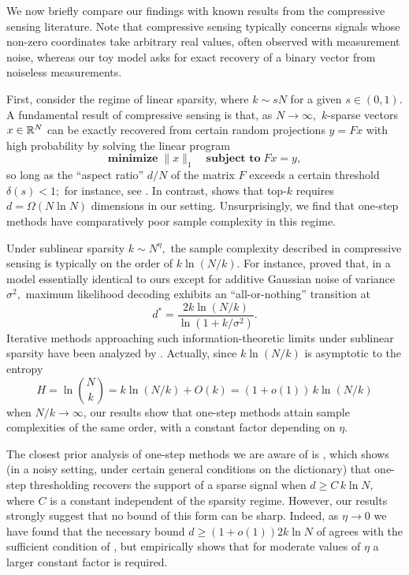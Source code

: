 We now briefly compare our findings with known results from the compressive sensing literature. Note that compressive sensing typically concerns signals whose non-zero coordinates take arbitrary real values, often observed with measurement noise, whereas our toy model asks for exact recovery of a binary vector from noiseless measurements.

First, consider the regime of linear sparsity, where $k \sim s N$ for a given $s \in (0, 1).$ A fundamental result of compressive sensing is that, as $N \to \infty,$ $k$-sparse vectors $x \in \mathbb{R}^N$ can be exactly recovered from certain random projections $y = F x$ with high probability by solving the linear program
$$
\textbf{minimize} \; \lVert x \rVert_1 \quad \textbf{subject to} \; F x = y,
$$
so long as the ``aspect ratio'' $d/N$ of the matrix $F$ exceeds a certain threshold $\delta(s) < 1;$ for instance, see \citet{donoho_precise_2010}. In contrast,  shows that top-$k$ requires $d = \Omega(N \ln N)$ dimensions in our setting. Unsurprisingly, we find that one-step methods have comparatively poor sample complexity in this regime.

Under sublinear sparsity $k \sim N^\eta,$ the sample complexity described in compressive sensing is typically on the order of $k \ln (N/k).$ For instance, \citet{reeves_all-or-nothing_2019} proved that, in a model essentially identical to ours except for additive Gaussian noise of variance $\sigma^2,$ maximum likelihood decoding exhibits an ``all-or-nothing'' transition at
$$
d^* = \frac{2 k \ln (N/k)}{\ln(1 + k/\sigma^2)}.
$$
Iterative methods approaching such information-theoretic limits under sublinear sparsity have been analyzed by \citet{truong_fundamental_2023, takeuchi_generalized_2024}. Actually, since $k \ln (N/k)$ is asymptotic to the entropy
$$
H = \ln \binom N k = k \ln (N/k) + O(k) = (1 + o(1)) \, k \ln(N/k)
$$
when $N/k \to \infty$, our results show that one-step methods attain sample complexities of the same order, with a constant factor depending on $\eta.$

The closest prior analysis of one-step methods we are aware of is \citet{bajwa_why_2010}, which shows (in a noisy setting, under certain general conditions on the dictionary) that one-step thresholding recovers the support of a sparse signal when $d \ge C\, k \ln N,$ where $C$ is a constant independent of the sparsity regime. However, our results strongly suggest that no bound of this form can be sharp. Indeed, as $\eta \to 0$ we have found that the necessary bound $d \ge (1 + o(1)) 2 k \ln N$ of  agrees with the sufficient condition of , but empirically  shows that for moderate values of $\eta$ a larger constant factor is required.

